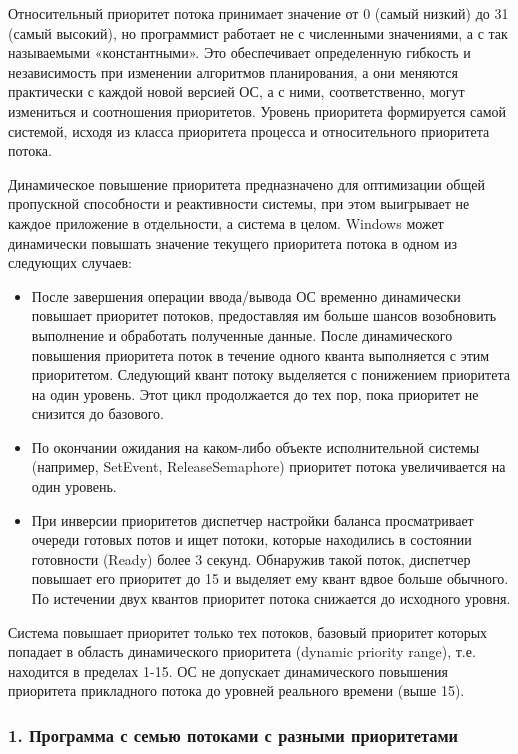 \documentclass[14pt,a4paper,report]{report}
\begin{document}
Относительный приоритет потока принимает значение от 0 (самый низкий) до 31 (самый высокий), но программист работает не с численными значениями, а с так называемыми «константными». Это обеспечивает определенную гибкость и независимость при изменении алгоритмов планирования, а они меняются практически с каждой новой версией ОС, а с ними, соответственно, могут измениться и соотношения приоритетов. Уровень приоритета формируется самой системой, исходя из класса приоритета процесса и относительного приоритета потока.

Динамическое повышение приоритета предназначено для оптимизации общей пропускной способности и реактивности системы, при этом выигрывает не каждое приложение в отдельности, а система в целом. Windows может динамически повышать значение текущего приоритета потока в одном из следующих случаев:

\begin{itemize}
	\item После завершения операции ввода/вывода ОС временно динамически повышает приоритет потоков, предоставляя им больше шансов возобновить выполнение и обработать полученные данные. После динамического повышения приоритета поток в течение одного кванта выполняется с этим приоритетом. Следующий квант потоку выделяется с понижением приоритета на один уровень. Этот цикл продолжается до тех пор, пока приоритет не снизится до базового.
	\item По окончании ожидания на каком-либо объекте исполнительной системы (например, SetEvent, ReleaseSemaphore) приоритет потока увеличивается на один уровень.
	\item При инверсии приоритетов диспетчер настройки баланса просматривает очереди готовых потов и ищет потоки, которые находились в состоянии готовности (Ready) более 3 секунд. Обнаружив такой поток, диспетчер повышает его приоритет до 15 и выделяет ему квант вдвое больше обычного. По истечении двух квантов приоритет потока снижается до исходного уровня.
\end{itemize}	

Система повышает приоритет только тех потоков, базовый приоритет которых попадает в область динамического приоритета (dynamic priority range), т.е. находится в пределах 1-15. ОС не допускает динамического повышения приоритета прикладного потока до уровней реального времени (выше 15).

\subsubsection{1. Программа с семью потоками с разными приоритетами}
\end{document}
